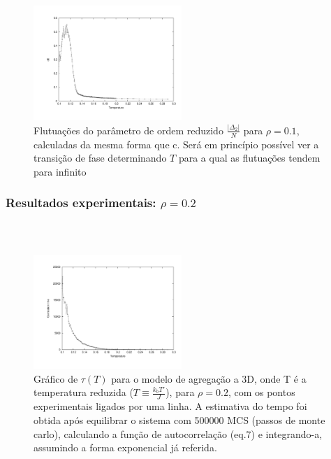 \documentclass[11pt]{beamer}
\begin{document}
\begin{frame}
\frametitle{\insertsection \\ {\small \insertsubsection}}
\begin{figure}
	\centering
		\includegraphics[width=0.5\textwidth, clip, trim = 1.7cm 1.5cm 1cm 1cm]{images/0.1/d2}
	\caption{{\footnotesize Flutuações do parâmetro de ordem reduzido $\frac{|\Delta_2|}{N}$ para $\rho = 0.1$, calculadas da mesma forma que c. Será em princípio possível ver a transição de fase determinando $T$ para a qual as flutuações tendem para infinito}}
	\label{fig:13}
\end{figure}
\end{frame}

\subsubsection{Resultados experimentais: $\rho=0.2$}

\begin{frame}
\frametitle{\insertsection \\ {\small \insertsubsection}}
\begin{figure}
	\centering
		\includegraphics[width=0.5\textwidth, clip, trim = 1.7cm 1.5cm 1cm 1cm]{images/ctimes2}
	\caption{{\footnotesize Gráfico de $\tau(T)$ para o modelo de agregação a 3D, onde T é a temperatura reduzida ($T\equiv\frac{k_b T'}{J}$), para $\rho = 0.2$, com os pontos experimentais ligados por uma linha. A estimativa do tempo foi obtida após equilibrar o sistema com 500000 MCS (passos de monte carlo), calculando a função de autocorrelação (eq.7) e integrando-a, assumindo a forma exponencial já referida.}}
	\label{fig:14}
\end{figure}
\end{frame}
\end{document}
